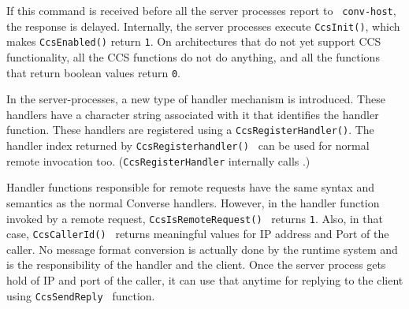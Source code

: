 If this command is received before all the server processes report to {\tt
conv-host}, the response is delayed. Internally, the server processes execute
{\tt CcsInit()}, which makes {\tt CcsEnabled()} return {\tt  1}. On
architectures that do not yet support CCS functionality, all the CCS functions
do not do anything, and all the functions that return boolean values return
{\tt  0}.

In the server-processes, a new type of handler mechanism is introduced. These
handlers have a character string associated with it that identifies the handler
function. These handlers are registered using a {\tt  CcsRegisterHandler()}.
The handler index returned by {\tt  CcsRegisterhandler() } can be used for
normal remote invocation too. ({\tt CcsRegisterHandler} internally calls
.)

Handler functions responsible for remote requests have the same syntax and
semantics as the normal Converse handlers. However, in the handler function
invoked by a remote request, {\tt CcsIsRemoteRequest() } returns {\tt  1}.
Also, in that case, {\tt  CcsCallerId() } returns meaningful values for IP
address and Port of the caller. No message format conversion is actually done
by the runtime system and is the responsibility of the handler and the client.
Once the server process gets hold of IP and port of the caller, it can use that
anytime for replying to the client using {\tt  CcsSendReply } function.







